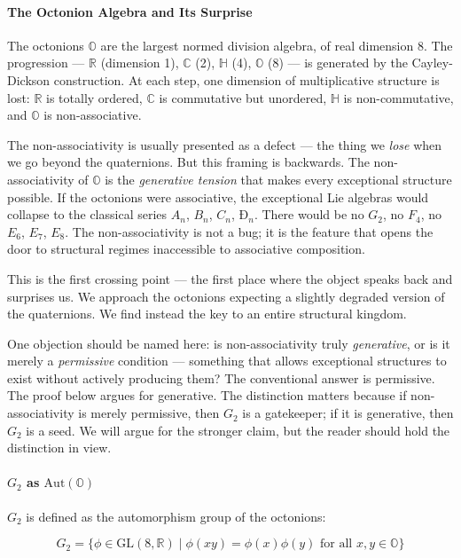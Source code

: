 \documentclass[12pt,a4paper]{article}
\begin{document}
\paragraph{The Octonion Algebra and Its Surprise}

The octonions $\mathbb{O}$ are the largest normed division algebra, of real dimension 8. The progression --- $\mathbb{R}$ (dimension 1), $\mathbb{C}$ (2), $\mathbb{H}$ (4), $\mathbb{O}$ (8) --- is generated by the Cayley-Dickson construction. At each step, one dimension of multiplicative structure is lost: $\mathbb{R}$ is totally ordered, $\mathbb{C}$ is commutative but unordered, $\mathbb{H}$ is non-commutative, and $\mathbb{O}$ is non-associative.

The non-associativity is usually presented as a defect --- the thing we \emph{lose} when we go beyond the quaternions. But this framing is backwards. The non-associativity of $\mathbb{O}$ is the \emph{generative tension} that makes every exceptional structure possible. If the octonions were associative, the exceptional Lie algebras would collapse to the classical series $A_n$, $B_n$, $C_n$, $Ð_n$. There would be no $G_2$, no $F_4$, no $E_6$, $E_7$, $E_8$. The non-associativity is not a bug; it is the feature that opens the door to structural regimes inaccessible to associative composition.

This is the first crossing point --- the first place where the object speaks back and surprises us. We approach the octonions expecting a slightly degraded version of the quaternions. We find instead the key to an entire structural kingdom.

One objection should be named here: is non-associativity truly \emph{generative}, or is it merely a \emph{permissive} condition --- something that allows exceptional structures to exist without actively producing them? The conventional answer is permissive. The proof below argues for generative. The distinction matters because if non-associativity is merely permissive, then $G_2$ is a gatekeeper; if it is generative, then $G_2$ is a seed. We will argue for the stronger claim, but the reader should hold the distinction in view.

\paragraph{$G_2$ as $\text{Aut}(\mathbb{O})$}

$G_2$ is defined as the automorphism group of the octonions:

\[G_2 = \{ \phi \in \text{GL}(8,\mathbb{R}) \mid \phi(xy) = \phi(x)\phi(y) \text{ for all } x,y \in \mathbb{O} \}\]
\end{document}

